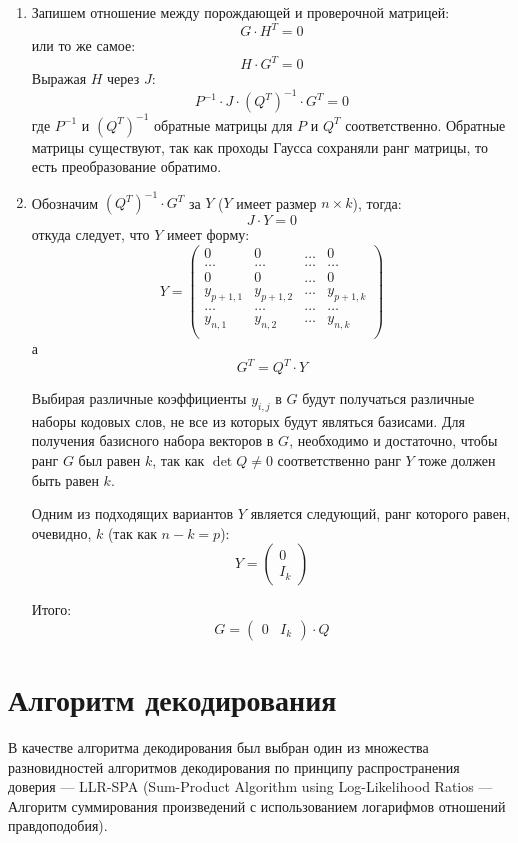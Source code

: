 \begin{enumerate}
 	\item Запишем отношение между порождающей и проверочной матрицей:
 	 \[
 	 	G \cdot H^T = 0
 	 \]
 	 или то же самое:
 	 \[
 	 	H \cdot G^T = 0
 	 \]
 	 Выражая $H$ через $J$:
 	 \[
 	 	P^{-1} \cdot J \cdot (Q^T)^{-1} \cdot G^T = 0
 	 \]
 	 где $P^{-1}$ и $(Q^T)^{-1}$ обратные матрицы для $P$ и $Q^T$ соответственно. Обратные матрицы существуют,
 	 так как проходы Гаусса сохраняли ранг матрицы, то есть преобразование обратимо.
 	 
 	 \item Обозначим $(Q^T)^{-1} \cdot G^T$ за $Y$ ($Y$ имеет размер $n\times k$), тогда:
 	\[
 		J \cdot Y = 0
 	\]
 	откуда следует, что $Y$ имеет форму:
 	\[
 		Y=\begin{pmatrix}
 			0 & 0 & \ldots & 0 \\
 			\ldots & \ldots & \ldots & \ldots \\
 			0 & 0 & \ldots & 0 \\
 			y_{p+1,1} & y_{p+1,2} & \ldots & y_{p+1,k} \\
 			\ldots & \ldots & \ldots & \ldots \\
 			y_{n,1} & y_{n,2} & \ldots & y_{n,k} \\
 		\end{pmatrix}
 	\]
 	а
 	\[
 	G^T = Q^T \cdot Y
 	\]
 	
 	Выбирая различные коэффициенты $y_{i,j}$ в $G$ будут получаться различные наборы кодовых слов,
 	не все из которых будут являться базисами. Для получения базисного набора векторов в $G$, необходимо
 	и достаточно, чтобы ранг $G$ был равен $k$, так как $\det Q \neq 0$ соответственно
 	 ранг $Y$ тоже должен быть равен $k$.
 	
 	Одним из подходящих вариантов $Y$ является следующий, ранг которого равен, 
 	очевидно, $k$ (так как $n - k = p$):
 	\[
 		Y=\begin{pmatrix}
 			0 \\
 			I_k
 		\end{pmatrix}
 	\]
 	
 	Итого:
 	\[
 	G=\begin{pmatrix}
 		0 & I_k
 	\end{pmatrix} \cdot Q
 	\] 
 \end{enumerate}

\section{Алгоритм декодирования}

В качестве алгоритма декодирования был выбран один из множества разновидностей алгоритмов декодирования
по принципу распространения доверия --- LLR-SPA (Sum-Product Algorithm using Log-Likelihood Ratios
--- Алгоритм суммирования произведений с использованием логарифмов отношений правдоподобия).

